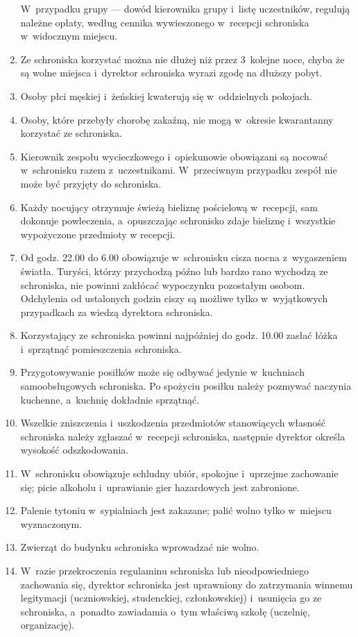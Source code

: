 \begin{enumerate}
W~przypadku grupy --- dowód kierownika grupy i~listę uczestników, regulują należne opłaty, według cennika wywieszonego w~recepcji schroniska w~widocznym miejscu.
\item Ze schroniska korzystać można nie dłużej niż przez 3~kolejne noce, chyba że są wolne miejsca i~dyrektor schroniska wyrazi zgodę na dłuższy pobyt.
\item Osoby płci męskiej i~żeńskiej kwaterują się w~oddzielnych pokojach.
\item Osoby, które przebyły chorobę zakaźną, nie mogą w~okresie kwarantanny korzystać ze schroniska.
\item Kierownik zespołu wycieczkowego i~opiekunowie obowiązani są nocować w~schronisku razem z~uczestnikami. W~przeciwnym przypadku zespół nie może być przyjęty do schroniska.
\item Każdy nocujący otrzymuje świeżą bieliznę pościelową w~recepcji, sam dokonuje powleczenia, a~opuszczając schronisko zdaje bieliznę i~wszystkie wypożyczone przedmioty w recepcji.
\item Od godz. 22.00 do 6.00 obowiązuje w~schronisku cisza nocna z~wygaszeniem światła. Turyści, którzy przychodzą późno lub bardzo rano wychodzą ze schroniska, nie powinni zakłócać wypoczynku pozostałym osobom. Odchylenia od ustalonych godzin ciszy są możliwe tylko w~wyjątkowych przypadkach za wiedzą dyrektora schroniska.
\item Korzystający ze schroniska powinni najpóźniej do godz. 10.00 zasłać łóżka i~sprzątnąć pomieszczenia schroniska.
\item Przygotowywanie posiłków może się odbywać jedynie w~kuchniach samoobsługowych schroniska. Po spożyciu posiłku należy pozmywać naczynia kuchenne, a~kuchnię dokładnie sprzątnąć.
\item Wszelkie zniszczenia i~uszkodzenia przedmiotów stanowiących własność schroniska należy zgłaszać w~recepcji schroniska, następnie dyrektor określa wysokość odszkodowania.
\item W~schronisku obowiązuje schludny ubiór, spokojne i~uprzejme zachowanie się; picie alkoholu i~uprawianie gier hazardowych jest zabronione.
\item Palenie tytoniu w~sypialniach jest zakazane; palić wolno tylko w~miejscu wyznaczonym.
\item Zwierząt do budynku schroniska wprowadzać nie wolno.
\item W~razie przekroczenia regulaminu schroniska lub nieodpowiedniego zachowania się, dyrektor schroniska jest uprawniony do zatrzymania winnemu legitymacji (uczniowskiej, studenckiej, członkowskiej) i~usunięcia go ze schroniska, a~ponadto zawiadamia o~tym właściwą szkołę (uczelnię, organizację).

\end{enumerate}
